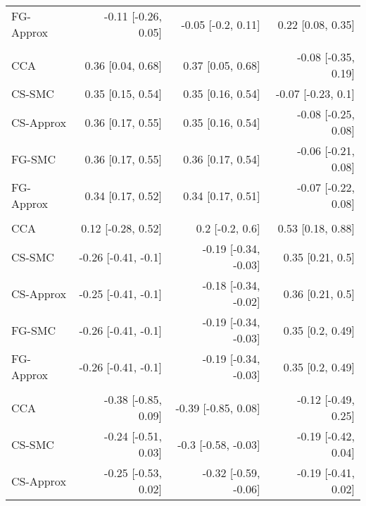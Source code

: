 \documentclass[
  12pt,
  a4paper,
]{article}
\begin{document}
\begin{longtable}[t]{lrrr}
\hspace{1em}FG-Approx & -0.11 [-0.26, 0.05] & -0.05 [-0.2, 0.11] & 0.22 [0.08, 0.35]\\
\addlinespace[0.3em]
\multicolumn{4}{l}{\textbf{Cytogenetics: abnormal}}\\
\hspace{1em}CCA & 0.36 [0.04, 0.68] & 0.37 [0.05, 0.68] & -0.08 [-0.35, 0.19]\\
\hspace{1em}CS-SMC & 0.35 [0.15, 0.54] & 0.35 [0.16, 0.54] & -0.07 [-0.23, 0.1]\\
\hspace{1em}CS-Approx & 0.36 [0.17, 0.55] & 0.35 [0.16, 0.54] & -0.08 [-0.25, 0.08]\\
\hspace{1em}FG-SMC & 0.36 [0.17, 0.55] & 0.36 [0.17, 0.54] & -0.06 [-0.21, 0.08]\\
\hspace{1em}FG-Approx & 0.34 [0.17, 0.52] & 0.34 [0.17, 0.51] & -0.07 [-0.22, 0.08]\\
\addlinespace[0.3em]
\multicolumn{4}{l}{\textbf{Donor relation: other}}\\
\hspace{1em}CCA & 0.12 [-0.28, 0.52] & 0.2 [-0.2, 0.6] & 0.53 [0.18, 0.88]\\
\hspace{1em}CS-SMC & -0.26 [-0.41, -0.1] & -0.19 [-0.34, -0.03] & 0.35 [0.21, 0.5]\\
\hspace{1em}CS-Approx & -0.25 [-0.41, -0.1] & -0.18 [-0.34, -0.02] & 0.36 [0.21, 0.5]\\
\hspace{1em}FG-SMC & -0.26 [-0.41, -0.1] & -0.19 [-0.34, -0.03] & 0.35 [0.2, 0.49]\\
\hspace{1em}FG-Approx & -0.26 [-0.41, -0.1] & -0.19 [-0.34, -0.03] & 0.35 [0.2, 0.49]\\
\addlinespace[0.3em]
\multicolumn{4}{l}{\textbf{Hemoglobin (per $5$ g/dL)}}\\
\hspace{1em}CCA & -0.38 [-0.85, 0.09] & -0.39 [-0.85, 0.08] & -0.12 [-0.49, 0.25]\\
\hspace{1em}CS-SMC & -0.24 [-0.51, 0.03] & -0.3 [-0.58, -0.03] & -0.19 [-0.42, 0.04]\\
\hspace{1em}CS-Approx & -0.25 [-0.53, 0.02] & -0.32 [-0.59, -0.06] & -0.19 [-0.41, 0.02]\\

\end{longtable}
\end{document}

